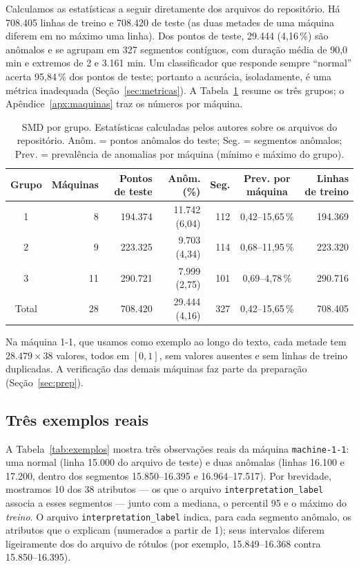 Calculamos as estatísticas a seguir diretamente dos arquivos do repositório. Há 708.405 linhas de treino e
708.420 de teste (as duas metades de uma máquina diferem em no máximo uma linha). Dos pontos de teste,
29.444 (4,16\,\%) são anômalos e se agrupam em 327 segmentos contíguos, com duração média de 90,0 min e
extremos de 2 e 3.161 min. Um classificador que responde sempre ``normal'' acerta 95,84\,\% dos pontos de
teste; portanto a acurácia, isoladamente, é uma métrica inadequada (Seção~\ref{sec:metricas}). A
Tabela~\ref{tab:grupos} resume os três grupos; o Apêndice~\ref{apx:maquinas} traz os números por máquina.

\begin{table}[htbp]
\centering
\caption{SMD por grupo. Estatísticas calculadas pelos autores sobre os arquivos do repositório. Anôm. =
pontos anômalos do teste; Seg. = segmentos anômalos; Prev. = prevalência de anomalias por máquina (mínimo e
máximo do grupo).}
\label{tab:grupos}
\small
\setlength{\tabcolsep}{5pt}
\begin{tabular}{crrrrcr}
\toprule
Grupo & Máquinas & Pontos de teste & Anôm. (\%) & Seg. & Prev. por máquina & Linhas de treino\\
\midrule
1 & 8  & 194.374 & 11.742 (6,04) & 112 & 0,42--15,65\,\% & 194.369\\
2 & 9  & 223.325 &  9.703 (4,34) & 114 & 0,68--11,95\,\% & 223.320\\
3 & 11 & 290.721 &  7.999 (2,75) & 101 & 0,69--4,78\,\%  & 290.716\\
\midrule
Total & 28 & 708.420 & 29.444 (4,16) & 327 & 0,42--15,65\,\% & 708.405\\
\bottomrule
\end{tabular}
\end{table}

Na máquina 1-1, que usamos como exemplo ao longo do texto, cada metade tem $28.479\times38$ valores, todos em
$[0,1]$, sem valores ausentes e sem linhas de treino duplicadas. A verificação das demais máquinas faz parte
da preparação (Seção~\ref{sec:prep}).

\subsection{Três exemplos reais}\label{sec:exemplos}
A Tabela~\ref{tab:exemplos} mostra três observações reais da máquina \texttt{machine-1-1}: uma normal
(linha 15.000 do arquivo de teste) e duas anômalas (linhas 16.100 e 17.200, dentro dos segmentos 15.850--16.395
e 16.964--17.517). Por brevidade, mostramos 10 dos 38 atributos --- os que o arquivo
\texttt{interpretation\_label} associa a esses segmentos --- junto com a mediana, o percentil 95 e o máximo
do \emph{treino}. O arquivo \texttt{interpretation\_label} indica, para cada segmento anômalo, os atributos
que o explicam (numerados a partir de 1); seus intervalos diferem ligeiramente dos do arquivo de rótulos
(por exemplo, 15.849--16.368 contra 15.850--16.395).

